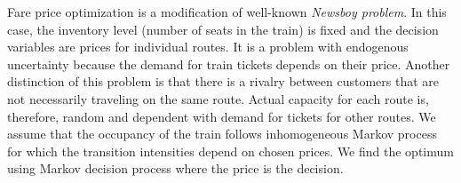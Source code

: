 Fare price optimization is a modification of well-known \emph{Newsboy problem}. In this case, the inventory level (number of seats in the train) is fixed and the decision variables are prices for individual routes. It is a problem with endogenous uncertainty because the demand for train tickets depends on their price. Another distinction of this problem is that there is a rivalry between customers that are not necessarily traveling on the same route. Actual capacity for each route is, therefore, random and dependent with demand for tickets for other routes.
We assume that the occupancy of the train follows inhomogeneous Markov process for which the transition intensities depend on chosen prices. We find the optimum using Markov decision process where the price is the decision.